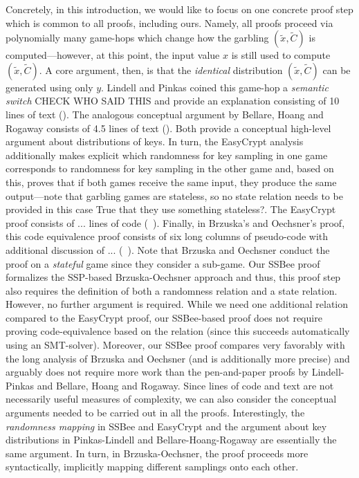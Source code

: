 Concretely, in this introduction, we would like to focus on one concrete
proof step which is common to all proofs, including ours. Namely, all proofs
proceed via polynomially many game-hops which change how the garbling $(\tilde{x},\tilde{C})$ 
is computed---however, at this point, the input value $x$ is still used to compute
$(\tilde{x},\tilde{C})$. A core argument, then, is that the \emph{identical}
distribution $(\tilde{x},\tilde{C})$ can be generated using only $y$. Lindell
and Pinkas coined this game-hop a \emph{semantic switch} {\color{blue}CHECK WHO SAID THIS}
and provide an explanation consisting of 10 lines of text (\cite[page 23]{X}). The
analogous conceptual argument by Bellare, Hoang and Rogaway consists of 4.5 lines of text (\cite[bottom of page 22]{X}). Both provide a conceptual high-level argument about distributions of keys. In turn,  the EasyCrypt analysis additionally makes explicit which randomness for key sampling in one game corresponds to randomness for key sampling in the other game and, based on this, proves that
if both games receive the same input, they produce the same output---note that garbling games are
stateless, so no state relation needs to be provided in this case {\color{blue}True that they use
something stateless?}. The EasyCrypt proof consists of ... lines of code (~\cite[page x]{X}).
Finally, in Brzuska's and Oechsner's proof, this code equivalence proof consists of six long
columns of pseudo-code with additional discussion of ... (~\cite[page x-y]{X}). Note that
Brzuska and Oechsner conduct the proof on a \emph{stateful} game since they consider a sub-game.
Our SSBee proof formalizes the SSP-based Brzuska-Oechsner approach and thus, this proof step
 also requires the definition of both a randomness relation and a state relation. However,
no further argument is required. While we need one additional relation compared to the EasyCrypt
proof, our SSBee-based proof does not require proving code-equivalence based on the relation
(since this succeeds automatically using an SMT-solver). Moreover, our SSBee proof compares
very favorably with the long analysis of Brzuska and Oechsner (and is additionally more precise)
and arguably does not require more work than the pen-and-paper proofs by Lindell-Pinkas
and Bellare, Hoang and Rogaway. Since lines of code and text are not necessarily useful measures
of complexity, we can also consider the conceptual arguments needed to be carried out in all the
proofs. Interestingly, the \emph{randomness mapping} in SSBee and EasyCrypt and the argument
about key distributions in Pinkas-Lindell and Bellare-Hoang-Rogaway are essentially the same
argument. In turn, in Brzuska-Oechsner, the proof proceeds more syntactically, implicitly mapping
different samplings onto each other.

